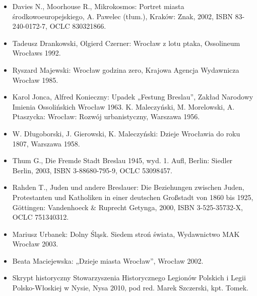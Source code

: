 \documentclass{article}
\begin{document}
\begin{itemize}
\item Davies N., Moorhouse R., Mikrokosmos: Portret miasta środkowoeuropejskiego, A. Pawelec (tłum.), Kraków: Znak, 2002, ISBN 83-240-0172-7, OCLC 830321866.

\item Tadeusz Drankowski, Olgierd Czerner: Wrocław z lotu ptaka, Ossolineum Wrocławs 1992.

\item Ryszard Majewski: Wrocław godzina zero, Krajowa Agencja Wydawnicza Wrocław 1985.

\item Karol Jonca, Alfred Konieczny: Upadek „Festung Breslau”, Zakład Narodowy Imienia Ossolińskich Wrocław 1963.
K. Maleczyński, M. Morelowski, A. Ptaszycka: Wrocław: Rozwój urbanistyczny, Warszawa 1956.

\item W. Długoborski, J. Gierowski, K. Maleczyński: Dzieje Wrocławia do roku 1807, Warszawa 1958.

\item Thum G., Die Fremde Stadt Breslau 1945, wyd. 1. Aufl, Berlin: Siedler Berlin, 2003, ISBN 3-88680-795-9, OCLC 53098457.

\item Rahden T., Juden und andere Breslauer: Die Beziehungen zwischen Juden, Protestanten und Katholiken in einer deutschen Großstadt von 1860 bis 1925, Göttingen: Vandenhoeck \& Ruprecht Getynga, 2000, ISBN 3-525-35732-X, OCLC 751340312.

\item Mariusz Urbanek: Dolny Śląsk. Siedem stroń świata, Wydawnictwo MAK Wrocław 2003.

\item Beata Maciejewska: „Dzieje miasta Wrocław”, Wrocław 2002.

\item Skrypt historyczny Stowarzyszenia Historycznego Legionów Polskich i Legii Polsko-Włoskiej w Nysie, Nysa 2010, pod red. Marek Szczerski, kpt. Tomek.
\end{itemize}
\end{document}
